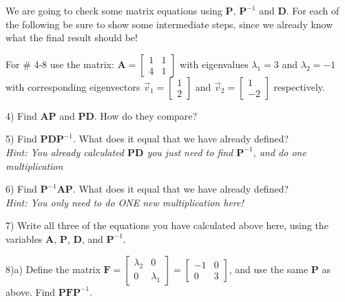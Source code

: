 \documentclass{article}
\begin{document}
\begin{flushleft}
\vspace{0.1in}

We are going to check some matrix equations using \textbf{P}, $\textbf{P}^{-1}$ and \textbf{D}. 
For each of the following be sure to show some intermediate steps, since we already know what the final result should be!

\vspace{0.1in}

For \# 4-8 use the matrix: $\textbf{A} = \begin{bmatrix} 1 & 1 \\ 4 & 1 \end{bmatrix}$ \hspace{0.2in} with eigenvalues $\lambda_1 = 3$ and $\lambda_2 = -1$ with corresponding eigenvectors $\vec{v}_1 = \begin{bmatrix} 1 \\ 2 \end{bmatrix}$ and $\vec{v}_2 = \begin{bmatrix} 1 \\ -2 \end{bmatrix}$ respectively.

\vspace{0.2in}

4) Find $\textbf{AP}$ and $\textbf{PD}$. How do they compare?

\vspace{2.5in}

5) Find $\textbf{PDP}^{-1}$. What does it equal that we have already defined? \\
\textit{Hint: You already calculated $\textbf{PD}$ you just need to find $\textbf{P}^{-1}$, and do one multiplication}

\vspace{2.5in}

6) Find $\textbf{P}^{-1} \textbf{AP}$. What does it equal that we have already defined?\\
\textit{Hint: You only need to do ONE new multiplication here!}

\vspace{2in}

7) Write all three of the equations you have calculated above here, using the variables \textbf{A}, \textbf{P}, \textbf{D}, and $\textbf{P}^{-1}$.

\vspace{1in}

8)a) Define the matrix $\textbf{F}=\begin{bmatrix} \lambda_2 & 0 \\ 0 & \lambda_1 \end{bmatrix} = \begin{bmatrix} -1 & 0 \\ 0 & 3 \end{bmatrix}$, and use the same \textbf{P} as above. Find $\textbf{PFP}^{-1}$. 


\end{flushleft}
\end{document}
